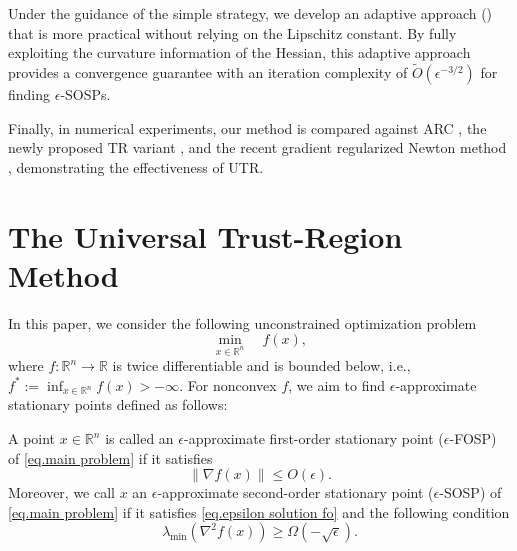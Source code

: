 Under the guidance of the simple strategy, we develop an adaptive approach () that is more practical without relying on the Lipschitz constant. By fully exploiting the curvature information of the Hessian, this adaptive approach provides a convergence guarantee with an iteration complexity of $\tilde O(\epsilon^{-3/2})$ for finding $\epsilon$-SOSPs. 

Finally, in numerical experiments, our method is compared against ARC \citep{cartis2011adaptive1,cartis2011adaptive2}, the newly proposed TR variant \citep{hamad2022consistently}, and the recent gradient regularized Newton method \citep{mishchenko_regularized_2023}, demonstrating the effectiveness of UTR.

\section{The Universal Trust-Region Method}\label{sec.overview}
In this paper, we consider the following unconstrained optimization problem
\begin{equation}
    \label{eq.main problem}
    \min_{x\in \mathbb{R}^n} \quad f(x),
\end{equation}
where $f:\mathbb{R}^n \to \mathbb{R}$ is twice differentiable and is bounded below, i.e., $f^*:=\inf _{x\in \mathbb{R}^n} f(x) >-\infty$. For nonconvex $f$, we aim to find $\epsilon$-approximate stationary points defined as follows:
\begin{definition}
    \label{def.sosp}
    A point $x\in \mathbb{R}^n$ is called an $\epsilon$-approximate first-order stationary point ($\epsilon$-FOSP) of \eqref{eq.main problem} if it satisfies
        \begin{equation}
            \label{eq.epsilon solution fo}
              \|\nabla f(x) \| \leq O(\epsilon).
    \end{equation}
    Moreover, we call $x$ an $\epsilon$-approximate second-order stationary point ($\epsilon$-SOSP) of \eqref{eq.main problem} if it satisfies \eqref{eq.epsilon solution fo} and the following condition   
    \begin{equation}
            \label{eq.epsilon solution so}
              \lambda_{\min}(\nabla ^2 f(x)) \geq \Omega(-\sqrt{\epsilon}).
    \end{equation}
\end{definition}

